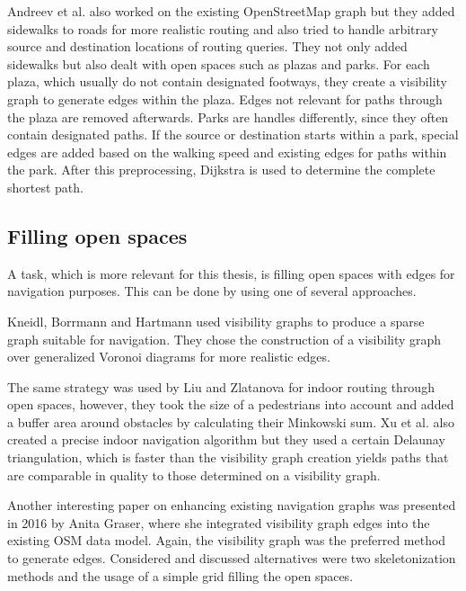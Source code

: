 		Andreev et al. also worked on the existing OpenStreetMap graph but they added sidewalks to roads for more realistic routing and also tried to handle arbitrary source and destination locations of routing queries\cite{andreev-osm-generate-sidewalks}.
		They not only added sidewalks but also dealt with open spaces such as plazas and parks.
		For each plaza, which usually do not contain designated footways, they create a visibility graph to generate edges within the plaza.
		Edges not relevant for paths through the plaza are removed afterwards.
		Parks are handles differently, since they often contain designated paths.
		If the source or destination starts within a park, special edges are added based on the walking speed and existing edges for paths within the park.
		After this preprocessing, Dijkstra is used to determine the complete shortest path.
	
	\subsection{Filling open spaces}
	\label{subsec:filling-open-spaces}
	
		A task, which is more relevant for this thesis, is filling open spaces with edges for navigation purposes.
		This can be done by using one of several approaches.
	
		Kneidl, Borrmann and Hartmann used visibility graphs to produce a sparse graph suitable for navigation\cite{kneidl-borrmann-hartmann-navigation}.
		They chose the construction of a visibility graph over generalized Voronoi diagrams for more realistic edges.
		
		The same strategy was used by Liu and Zlatanova for indoor routing through open spaces\cite{liu-indoor-routing}, however, they took the size of a pedestrians into account and added a buffer area around obstacles by calculating their Minkowski sum.
		Xu et al. also created a precise indoor navigation algorithm but they used a certain Delaunay triangulation, which is faster than the visibility graph creation yields paths that are comparable in quality to those determined on a visibility graph\cite{xu-indoor-delaunay}.
		
		Another interesting paper on enhancing existing navigation graphs was presented in 2016 by Anita Graser, where she integrated visibility graph edges into the existing OSM data model\cite{graser-osm-open-spaces}.
		Again, the visibility graph was the preferred method to generate edges.
		Considered and discussed alternatives were two skeletonization methods and the usage of a simple grid filling the open spaces.
		
